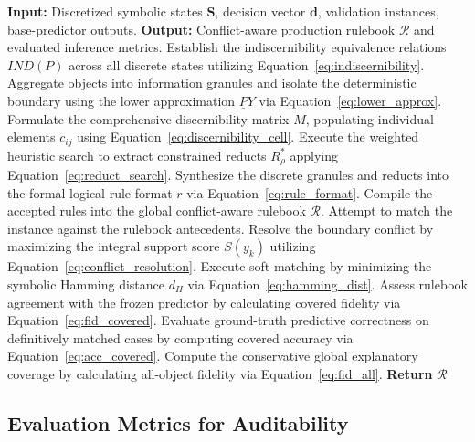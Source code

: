 \documentclass[make,article,submit,pdftex,moreauthors]{Definitions/mdpi}
\newcommand{\Rule}{\mathcal{R}}
\begin{document}
\begin{algorithm}[!ht]
\caption{Rough-Set Granulation, Reduct Solver, and Inference (Phases 2.2--2.3)}
\label{alg:phase2_roughset}
\begin{algorithmic}[1]
\Statex \textbf{Input:} Discretized symbolic states $\mathbf{S}$, decision vector $\mathbf{d}$, validation instances, base-predictor outputs.
\Statex \textbf{Output:} Conflict-aware production rulebook $\Rule$ and evaluated inference metrics.
\State Establish the indiscernibility equivalence relations $IND(P)$ across all discrete states utilizing Equation~\eqref{eq:indiscernibility}.
\State Aggregate objects into information granules and isolate the deterministic boundary using the lower approximation $\underline{P}Y$ via Equation~\eqref{eq:lower_approx}.
\State Formulate the comprehensive discernibility matrix $M$, populating individual elements $c_{ij}$ using Equation~\eqref{eq:discernibility_cell}.
\State Execute the weighted heuristic search to extract constrained reducts $R_{\rho}^{\ast}$ applying Equation~\eqref{eq:reduct_search}.
\State Synthesize the discrete granules and reducts into the formal logical rule format $r$ via Equation~\eqref{eq:rule_format}.
\State Compile the accepted rules into the global conflict-aware rulebook $\Rule$.
    \State Attempt to match the instance against the rulebook antecedents.
        \State Resolve the boundary conflict by maximizing the integral support score $S(y_k)$ utilizing Equation~\eqref{eq:conflict_resolution}.
        \State Execute soft matching by minimizing the symbolic Hamming distance $d_H$ via Equation~\eqref{eq:hamming_dist}.
    \EndIf
\EndFor
\State Assess rulebook agreement with the frozen predictor by calculating covered fidelity via Equation~\eqref{eq:fid_covered}.
\State Evaluate ground-truth predictive correctness on definitively matched cases by computing covered accuracy via Equation~\eqref{eq:acc_covered}.
\State Compute the conservative global explanatory coverage by calculating all-object fidelity via Equation~\eqref{eq:fid_all}.
\State \textbf{Return} $\Rule$
\end{algorithmic}
\end{algorithm}

\subsection{Evaluation Metrics for Auditability}
\label{subsec:eval_metrics}
\end{document}
